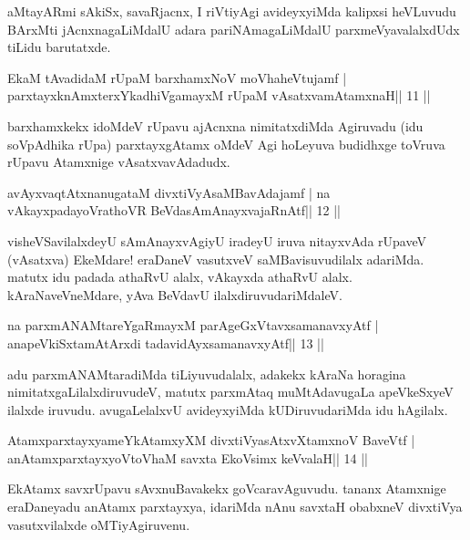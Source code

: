 \begin{artha}
aMtayARmi sAkiSx, savaRjacnx, I riVtiyAgi avideyxyiMda kalipxsi
heVLuvudu BArxMti jAcnxnagaLiMdalU adara pariNAmagaLiMdalU
parxmeVyavalalxdUdx tiLidu barutatxde.
\end{artha}

\begin{shl}
EkaM tAvadidaM rUpaM barxhamxNoV moVhaheVtujamf |
parxtayxknAmxterxYkadhiVgamayxM rUpaM vAsatxvamAtamxnaH\hfill || 11 ||
\end{shl}

\begin{artha}
barxhamxkekx idoMdeV rUpavu ajAcnxna nimitatxdiMda Agiruvadu (idu
soVpAdhika rUpa) parxtayxgAtamx oMdeV Agi hoLeyuva budidhxge toVruva
rUpavu Atamxnige vAsatxvavAdadudx.
\end{artha}

\begin{shl}
avAyxvaqtAtxnanugataM divxtiVyAsaMBavAdajamf |
na vAkayxpadayoVrathoVR BeVdasAmAnayxvajaRnAtf\hfill || 12 ||
\end{shl}

\begin{artha}
visheVSavilalxdeyU sAmAnayxvAgiyU iradeyU iruva nitayxvAda rUpaveV (vAsatxva) EkeMdare! eraDaneV vasutxveV saMBavisuvudilalx adariMda. matutx idu padada athaRvU alalx, vAkayxda athaRvU alalx. kAraNaveVneMdare, yAva BeVdavU ilalxdiruvudariMdaleV.
\end{artha}

\begin{shl}
na parxmANAMtareYgaRmayxM parAgeGxVtavxsamanavxyAtf |
anapeVkiSxtamAtArxdi tadavidAyxsamanavxyAtf\hfill || 13 ||
\end{shl}

\begin{artha}
adu parxmANAMtaradiMda tiLiyuvudalalx, adakekx kAraNa horagina nimitatxgaLilalxdiruvudeV, matutx parxmAtaq muMtAdavugaLa apeVkeSxyeV ilalxde iruvudu. avugaLelalxvU avideyxyiMda kUDiruvudariMda idu hAgilalx.
\end{artha}



\begin{shl}
AtamxparxtayxyameYkAtamxyXM divxtiVyasAtxvXtamxnoV BaveVtf |
anAtamxparxtayxyoV\s toV\s haM savxta EkoV\s simx keVvalaH\hfill || 14 ||
\end{shl}

\begin{artha}
EkAtamx savxrUpavu sAvxnuBavakekx goVcaravAguvudu. tananx Atamxnige
eraDaneyadu anAtamx parxtayxya, idariMda nAnu savxtaH obabxneV
divxtiVya vasutxvilalxde oMTiyAgiruvenu.
\end{artha}

